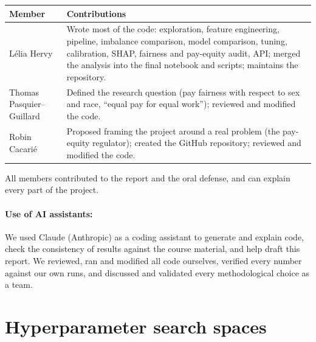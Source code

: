 \documentclass[11pt,a4paper]{article}
\begin{document}
\begin{table}[H]
\centering\small
\begin{tabularx}{\textwidth}{lX}
\toprule
\rowcolor{headblue}
Member & Contributions \\
\midrule
Lélia Hervy & Wrote most of the code: exploration, feature engineering, pipeline, imbalance comparison, model comparison, tuning, calibration, SHAP, fairness and pay-equity audit, API; merged the analysis into the final notebook and scripts; maintains the repository. \\
Thomas Pasquier--Guillard & Defined the research question (pay fairness with respect to sex and race, ``equal pay for equal work''); reviewed and modified the code. \\
Robin Cacarié & Proposed framing the project around a real problem (the pay-equity regulator); created the GitHub repository; reviewed and modified the code. \\
\bottomrule
\end{tabularx}
\end{table}
\noindent All members contributed to the report and the oral defense, and can explain every part of the project.

\paragraph{Use of AI assistants:} We used Claude (Anthropic) as a coding assistant to generate and explain code, check the consistency of results against the course material, and help draft this report. We reviewed, ran and modified all code ourselves, verified every number against our own runs, and discussed and validated every methodological choice as a team.


\appendix
\section{Hyperparameter search spaces}\label{app:spaces}
\end{document}
